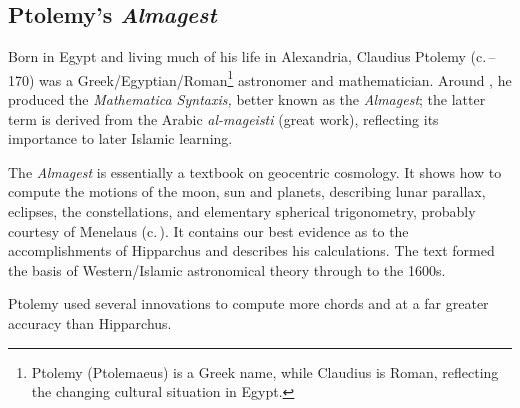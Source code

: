 
\clearpage


\subsection{Ptolemy's \emph{Almagest}}

Born in Egypt and living much of his life in Alexandria, Claudius Ptolemy (c.\,--170) was a Greek/Egyptian/Roman\footnote{Ptolemy (Ptolemaeus) is a Greek name, while Claudius is Roman, reflecting the changing cultural situation in Egypt.} astronomer and mathematician. Around , he produced the \emph{Mathematica Syntaxis,} better known as the \emph{Almagest}; the latter term is derived from the Arabic \emph{al-mageisti} (great work), reflecting its importance to later Islamic learning.\par
 
The \emph{Almagest} is essentially a textbook on geocentric cosmology. It shows how to compute the motions of the moon, sun and planets, describing lunar parallax, eclipses, the constellations, and elementary spherical trigonometry, probably courtesy of Menelaus (c.\,). It contains our best evidence as to the accomplishments of Hipparchus and describes his calculations. The text formed the basis of Western/Islamic astronomical theory through to the 1600s.\par



Ptolemy used several innovations to compute more chords and at a far greater accuracy than Hipparchus.

